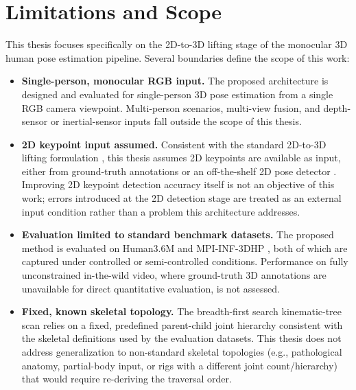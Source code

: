 \section{Limitations and Scope}
\label{sec:intro-limitations}

This thesis focuses specifically on the 2D-to-3D lifting stage of the
monocular 3D human pose estimation pipeline. Several boundaries define the
scope of this work:

\begin{itemize}
  \item \textbf{Single-person, monocular RGB input.} The proposed
    architecture is designed and evaluated for single-person 3D pose
    estimation from a single RGB camera viewpoint. Multi-person scenarios,
    multi-view fusion, and depth-sensor or inertial-sensor inputs fall
    outside the scope of this thesis.

  \item \textbf{2D keypoint input assumed.} Consistent with the standard
    2D-to-3D lifting formulation \cite{pavllo2019videopose3d}, this thesis
    assumes 2D keypoints are available as input, either from ground-truth
    annotations or an off-the-shelf 2D pose detector \cite{sun2019hrnet}.
    Improving 2D keypoint detection accuracy itself is not an objective of
    this work; errors introduced at the 2D detection stage are treated as
    an external input condition rather than a problem this architecture
    addresses.

  \item \textbf{Evaluation limited to standard benchmark datasets.} The
    proposed method is evaluated on Human3.6M \cite{ionescu2014human36m}
    and MPI-INF-3DHP \cite{mehta2017mpiinf3dhp}, both of which are
    captured under controlled or semi-controlled conditions. Performance
    on fully unconstrained in-the-wild video, where ground-truth 3D
    annotations are unavailable for direct quantitative evaluation, is not
    assessed.

  \item \textbf{Fixed, known skeletal topology.} The breadth-first search
    kinematic-tree scan relies on a fixed, predefined parent-child joint
    hierarchy \cite{loper2015smpl} consistent with the skeletal
    definitions used by the evaluation datasets. This thesis does not
    address generalization to non-standard skeletal topologies (e.g.,
    pathological anatomy, partial-body input, or rigs with a different
    joint count/hierarchy) that would require re-deriving the traversal
    order.


\end{itemize}
